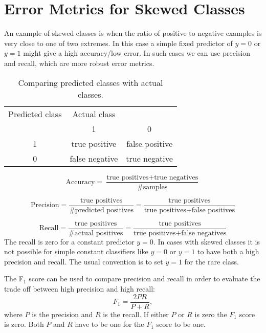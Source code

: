 \documentclass[a4paper]{report}
\begin{document}
\section{Error Metrics for Skewed Classes}
An example of skewed classes is when the ratio of positive to negative examples is very close to one of two extremes. In this case a simple fixed predictor of $y=0$ or $y=1$ might give a high accuracy/low error. In such cases we can use precision and recall, which are more robust error metrics.

\begin{table}[h]
\centering
\begin{tabular}{c|cc}
Predicted class & Actual class &\\
& 1 & 0\\
\hline
1 & true positive & false positive \\
0 & false negative & true negative
\end{tabular}
\caption{Comparing predicted classes with actual classes.}
\label{tab:precision}
\end{table}

\begin{equation}
\text{Accuracy} = \frac{\text{true positives}+\text{true negatives}}{\text{\# samples}}
\end{equation}

\begin{equation}
\text{Precision} = \frac{\text{true positives}}{\text{\# predicted positives}} = \frac{\text{true positives}}{\text{true positives}+\text{false positives}}
\end{equation}

\begin{equation}
\text{Recall} = \frac{\text{true positives}}{\text{\# actual positives}} = \frac{\text{true positives}}{\text{true positives}+\text{false negatives}}
\end{equation}
The recall is zero for a constant predictor $y=0$. In cases with skewed classes it is not possible for simple constant classifiers like $y=0$ or $y=1$ to have both a high precision and recall. The usual convention is to set $y=1$ for the rare class.

The F$_1$ score can be used to compare precision and recall in order to evaluate the trade off between high precision and high recall:
\begin{equation}
F_1 = \frac{2PR}{P+R},
\end{equation}
where $P$ is the precision and $R$ is the recall. If either $P$ or $R$ is zero the $F_1$ score is zero. Both $P$ and $R$ have to be one for the $F_1$ score to be one.
\end{document}
